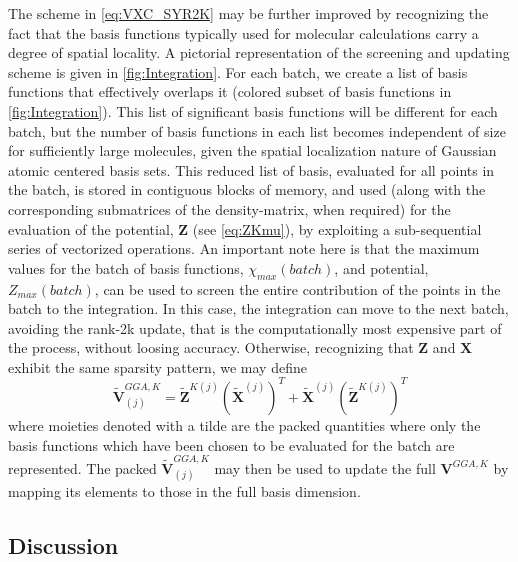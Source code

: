 The scheme in \cref{eq:VXC_SYR2K} may be further improved by recognizing the fact  that the basis functions typically used for molecular calculations carry 
a degree of spatial locality. 
A pictorial representation of the screening and updating scheme is given in \cref{fig:Integration}.
For each batch, we create a list of basis functions
that effectively overlaps it (colored subset of basis functions in \cref{fig:Integration}). 
This list of significant basis functions will be different for
each batch, but the number of basis
functions in each list becomes independent of size
for sufficiently large molecules, given the  spatial localization nature of Gaussian atomic centered basis sets.
This reduced list of basis, evaluated for all points in the batch, is stored in contiguous blocks of memory, and used (along with the corresponding submatrices of the density-matrix, when required) for the evaluation of the potential, $\mathbf{Z}$ (see \cref{eq:ZKmu}), by exploiting a sub-sequential series of vectorized operations.
An important note here is that the maximum values for the batch of basis functions, $\chi_{max}(batch)$, and potential, $Z_{max}(batch)$, can be used to screen the entire contribution of the points in the batch to the integration. In this case, the integration can move to the next batch, avoiding the rank-2k update, that is the computationally most expensive part of the process,  without loosing accuracy.
Otherwise, recognizing that $\mathbf{Z}$ and $\mathbf{X}$ exhibit the same sparsity pattern, we may define
\begin{equation}
\tilde{\mathbf{V}}_{(j)}^{GGA,K} = \tilde{\mathbf{Z}}^{K(j)} \left(\tilde{\mathbf{X}}^{(j)}\right)^T + 
\tilde{\mathbf{X}}^{(j)} \left(\tilde{\mathbf{Z}}^{K(j)}\right)^T
\end{equation}
where moieties denoted with a tilde are the packed quantities where only the basis functions which have been chosen to be evaluated for the batch are represented.
The packed $\tilde{\mathbf{V}}_{(j)}^{GGA,K}$ may then be used to update the full $\mathbf{V}^{GGA,K}$ by mapping its elements to those in the full basis dimension.

\subsection{Discussion}


